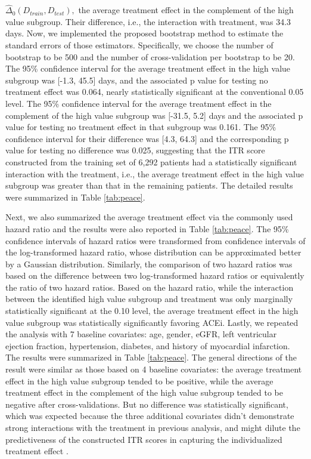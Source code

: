 \documentclass[12pt]{article}
\begin{document}
 $\hat{\Delta}_0(D_{train}, D_{test}),$ the average treatment effect in the complement of the high value subgroup. Their difference, i.e., the interaction with treatment, was 34.3 days.  Now, we implemented the proposed bootstrap method to estimate the standard errors of those estimators. Specifically, we choose the number of bootstrap to be 500 and the number of cross-validation per bootstrap to be 20.  The 95\% confidence interval for the average treatment effect in the high value subgroup was [-1.3, 45.5] days, and the associated p value for testing no treatment effect was 0.064, nearly statistically significant at the conventional 0.05 level.  The 95\% confidence interval for the average treatment effect in the complement of the high value subgroup was [-31.5, 5.2] days and the associated p value for testing no treatment effect in that subgroup was 0.161.  The 95\% confidence interval for their difference was [4.3, 64.3] and the corresponding p value for testing no difference was 0.025, suggesting that the ITR score constructed from the training set of 6,292 patients had a statistically significant interaction with the treatment, i.e., the average treatment effect in the high value subgroup was greater than that in the remaining patients. The detailed results were summarized in Table \ref{tab:peace}. 
 
 Next, we also summarized the average treatment effect via the commonly used hazard ratio and the results were also reported in Table \ref{tab:peace}. The 95\% confidence intervals of hazard ratios were transformed from confidence intervals of the log-transformed hazard ratio, whose distribution can be approximated better by a Gaussian distribution.  Similarly, the comparison of two hazard ratios was based on the difference between two log-transformed hazard ratios or equivalently the ratio of two hazard ratios. Based on the hazard ratio, while the interaction between the identified high value subgroup and treatment was only marginally statistically significant at the 0.10 level, the average treatment effect in the high value subgroup was statistically significantly favoring ACEi. Lastly, we repeated the analysis with 7 baseline covariates: age, gender, eGFR, left ventricular ejection fraction, hypertension, diabetes, and history of myocardial infarction. The results were summarized in Table \ref{tab:peace}.  The general directions of the result were similar as those based on 4 baseline covariates: the average treatment effect in the high value subgroup tended to be positive, while the average treatment effect in the complement of the high value subgroup tended to be negative after cross-validations. But no difference was statistically significant, which was expected because the three additional covariates didn't demonstrate strong interactions with the treatment in previous analysis, and might dilute the predictiveness of the constructed ITR scores in capturing the individualized treatment effect \cite{zhao2013effectively}.
\end{document}
